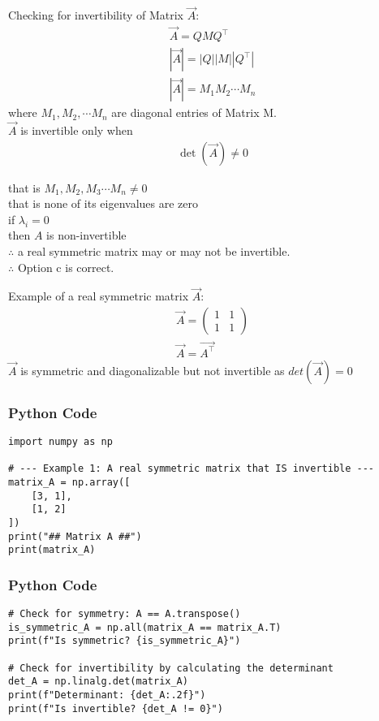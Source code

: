 \documentclass{beamer}
\begin{document}
\begin{frame}
Checking for invertibility of Matrix  $\vec{A}$:
\begin{align}
\vec{A} = Q M Q^\top \\|\vec{A}| = |Q| |M| |Q^\top|\\
|\vec{A}| = M_1 M_2 \cdots M_n
\end{align}
where $M_1, M_2, \cdots M_n$ are diagonal entries of Matrix M.\\
$\vec{A}$ is invertible only when 
\begin{align}
\det(\vec{A}) \neq 0 
\end{align}
\end{frame}
\begin{frame}
that is $M_1, M_2, M_3 \cdots M_n \neq 0$ \\
that is none of its eigenvalues are zero \\

if $\lambda_i = 0$ \\
then $A$ is non-invertible \\

$\therefore$ a real symmetric matrix may or may not be invertible.\\
$\therefore$ Option c is correct.
\end{frame}
\begin{frame}
Example of a real symmetric matrix $\vec{A}$:
\begin{align}
    \vec{A}=\begin{pmatrix}
        1 & 1\\1& 1
    \end{pmatrix}\\
    \vec{A}=\vec{A^\top}
\end{align}
$\vec{A}$ is symmetric and diagonalizable but not invertible as $det(\vec{A})=0$
\end{frame}

\begin{frame}[fragile]
\frametitle{Python Code}
\begin{lstlisting}
import numpy as np

# --- Example 1: A real symmetric matrix that IS invertible ---
matrix_A = np.array([
    [3, 1],
    [1, 2]
])
print("## Matrix A ##")
print(matrix_A)
\end{lstlisting}
\end{frame}

\begin{frame}[fragile]
\frametitle{Python Code}
\begin{lstlisting}
# Check for symmetry: A == A.transpose()
is_symmetric_A = np.all(matrix_A == matrix_A.T)
print(f"Is symmetric? {is_symmetric_A}")

# Check for invertibility by calculating the determinant
det_A = np.linalg.det(matrix_A)
print(f"Determinant: {det_A:.2f}")
print(f"Is invertible? {det_A != 0}")
\end{lstlisting}
\end{frame}
\end{document}
